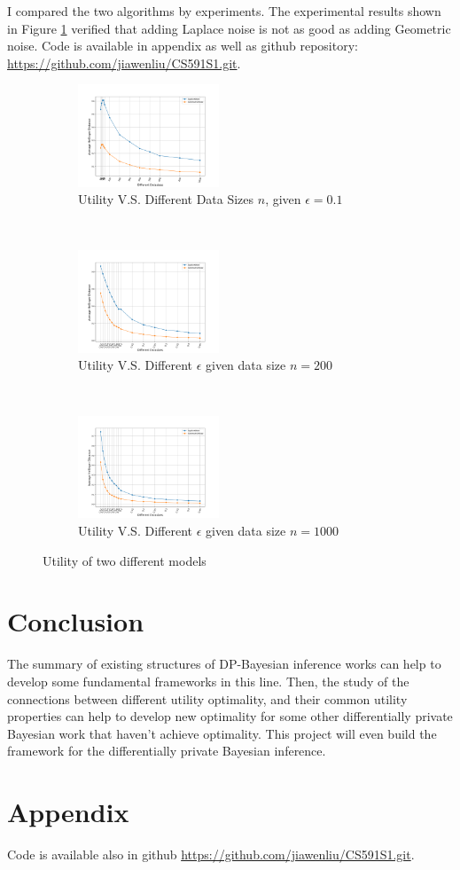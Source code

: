 \documentclass{article}
\begin{document}
I compared the two algorithms by experiments. The experimental results shown in Figure \ref{fig_geovslap} verified that adding Laplace noise is not as good as adding Geometric noise. Code is available in appendix as well as github repository: \url{https://github.com/jiawenliu/CS591S1.git}.  
\begin{figure}[t!]
    \centering
    \begin{subfigure}[t]{0.3\textwidth}
        \centering
        \includegraphics[height=1.2in]{datasize.png}
        \caption{Utility V.S. Different Data Sizes $n$, given $\epsilon = 0.1$}
    \end{subfigure}%
    ~ 
    \begin{subfigure}[t]{0.3\textwidth}
        \centering
        \includegraphics[height=1.2in]{eps_size200}
        \caption{Utility V.S. Different $\epsilon$ given data size $n = 200$}
    \end{subfigure}
    ~ 
    \begin{subfigure}[t]{0.3\textwidth}
        \centering
        \includegraphics[height=1.2in]{eps_size1000}
        \caption{Utility V.S. Different $\epsilon$ given data size $n = 1000$}
    \end{subfigure}
    \caption{Utility of two different models}
    \label{fig_geovslap}
\end{figure}
%

\section{Conclusion}
The summary of existing structures of DP-Bayesian inference works can help to develop some fundamental frameworks in this line. Then, the study of the connections between different utility optimality, and their common utility properties can help to develop new optimality for some other differentially private Bayesian work that haven't achieve optimality. This project will even build the framework for the differentially private Bayesian inference.

\section*{Appendix}
Code is available also in github \url{https://github.com/jiawenliu/CS591S1.git}.




\newpage


\end{document}
